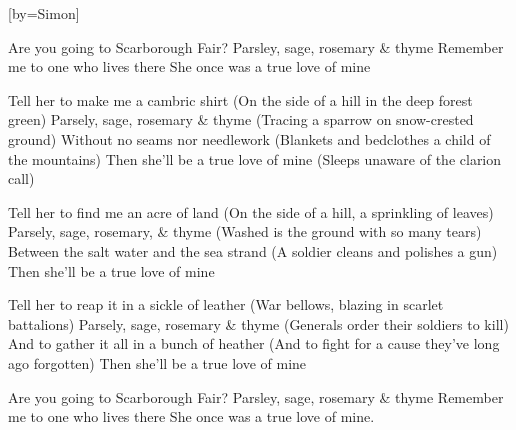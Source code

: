 


[by=Simon]

\begin{Large}



\beginverse
Are you going to Scarborough Fair?
Parsley, sage, rosemary \& thyme
Remember me to one who lives there
She once was a true love of mine
\endverse

\beginverse
Tell her to make me a cambric shirt
(On the side of a hill in the deep forest green)
Parsely, sage, rosemary \& thyme
(Tracing a sparrow on snow-crested ground)
Without no seams nor needlework
(Blankets and bedclothes a child of the mountains)
Then she'll be a true love of mine
(Sleeps unaware of the clarion call)
\endverse

\beginverse
Tell her to find me an acre of land
(On the side of a hill, a sprinkling of leaves)
Parsely, sage, rosemary, \& thyme
(Washed is the ground with so many tears)
Between the salt water and the sea strand
(A soldier cleans and polishes a gun)
Then she'll be a true love of mine
\endverse

\beginverse
Tell her to reap it in a sickle of leather
(War bellows, blazing in scarlet battalions)
Parsely, sage, rosemary \& thyme
(Generals order their soldiers to kill)
And to gather it all in a bunch of heather
(And to fight for a cause they've long ago forgotten)
Then she'll be a true love of mine
\endverse

\beginverse
Are you going to Scarborough Fair?
Parsley, sage, rosemary \& thyme
Remember me to one who lives there
She once was a true love of mine.
\endverse



\end{Large}

\chordson
\endsong
